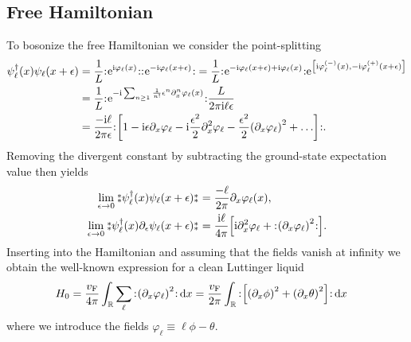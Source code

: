 \documentclass[english, parskip=full]{scrartcl}
\begin{document}
\subsection{Free Hamiltonian}
To bosonize the free Hamiltonian we consider the point-splitting
\begin{align}
\psi_\ell^\dagger(x) \psi_\ell(x+\epsilon) &= \frac{1}{L} \normord{\powe{\i\varphi_\ell(x)}} \normord{\powe{-\i\varphi_\ell(x+\epsilon)}} = \frac{1}{L} \normord{\powe{-\i\varphi_\ell(x+\epsilon) + \i\varphi_\ell(x)}} \powe{\klb*{\i\varphi_\ell^{(-)}(x), -\i\varphi_\ell^{(+)}(x+\epsilon)}} \\
&= \frac{1}{L} \normord{\powe{-\i\sum_{n\ge 1} \frac{1}{n!} \epsilon^n \partial_x^n\varphi_\ell(x)}} \frac{L}{2\pi\i\ell \epsilon} \\
&= \frac{-\i\ell}{2\pi\epsilon} \normord{\klb*{1 -\i \epsilon \partial_x\varphi_\ell - \i \frac{\epsilon^2}{2} \partial_x^2\varphi_\ell - \frac{\epsilon^2}{2} \kla*{\partial_x\varphi_\ell}^2 + \dots} }.
\end{align}
Removing the divergent constant by subtracting the ground-state expectation value then yields
\begin{align}
\lim_{\epsilon\rightarrow 0} \varnormord{\psi_\ell^\dagger(x) \psi_\ell(x+\epsilon)} &= \frac{-\ell}{2\pi} \partial_x\varphi_\ell(x),\\
\lim_{\epsilon\rightarrow 0} \varnormord{\psi_\ell^\dagger(x)\partial_\epsilon \psi_\ell(x+\epsilon)} &= \frac{\i\ell}{4\pi} \klb*{\i \partial_x^2\varphi_\ell + \normord{\kla*{\partial_x\varphi_\ell}^2} }.
\end{align}
Inserting into the Hamiltonian and assuming that the fields vanish at infinity we obtain the well-known expression for a clean Luttinger liquid
\begin{align}
H_0 &= \frac{\vf}{4\pi} \intr{\sum_\ell \normord{ \kla*{\partial_x\varphi_\ell}^2 }}{x} = \frac{\vf}{2\pi} \intr{ \normord{ \klb*{\kla*{\partial_x\phi}^2 + \kla*{\partial_x\theta}^2} }}{x}
\end{align}
where we introduce the fields $\varphi_\ell\equiv \ell\phi - \theta$.
\end{document}
